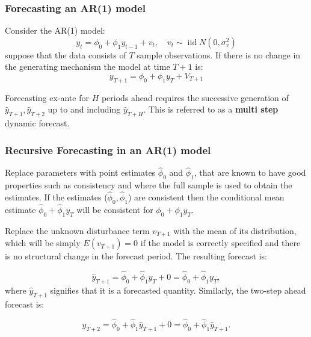 \documentclass[11pt]{article}
\begin{document}
\subsubsection{Forecasting an AR(1) model}

Consider the AR(1) model:
\begin{equation}
y_t=\phi_0+\phi_1 y_{t-1}+v_t, \quad v_t \sim \operatorname{iid} N\left(0, \sigma_v^2\right)
\end{equation}
suppose that the data consists of $T$ sample observations. If there is no change in the generating mechanism the model at time $T+1$ is:
\begin{equation}
y_{T+1}=\phi_0+\phi_1 y_T+V_{T+1}
\end{equation}

Forecasting ex-ante for $H$ periods ahead requires the successive generation of $\hat{y}_{T+1}, \hat{y}_{T+2}$ up to and including $\hat{y}_{T+H}$. This is referred to as a \textbf{multi step} dynamic forecast.

\subsubsection{Recursive Forecasting in an AR(1) model}
Replace parameters with point estimates $\hat{\phi}_{0}$ and $\hat{\phi}_1$, that are known to have good properties such as consistency and where the full sample is used to obtain the estimates. If the estimates ($\hat{\phi}_{0},\hat{\phi}_1$) are consistent then the conditional mean estimate $\hat{\phi}_0 + \hat{\phi}_1 y_T$ will be consistent for $\phi_0 + \phi_1 y_T$.

Replace the unknown disturbance term $v_{T+1}$ with the mean of its distribution, which will be simply $E(v_{T+1})=0$ if the model is correctly specified and there is no structural change in the forecast period. The resulting forecast is:

\begin{equation}
\widehat{y}_{T+1}=\widehat{\phi}_0+\widehat{\phi}_1 y_T+0=\widehat{\phi}_0+\widehat{\phi}_1 y_T,
\end{equation}
where $\hat{y}_{T+1}$ signifies that it is a forecasted quantity. Similarly, the two-step ahead forecast is:

\begin{equation}
\widehat{y}_{T+2}=\widehat{\phi}_0+\widehat{\phi}_1 \widehat{y}_{T+1}+0=\widehat{\phi}_0+\widehat{\phi}_1 \widehat{y}_{T+1} .
\end{equation}
\end{document}
